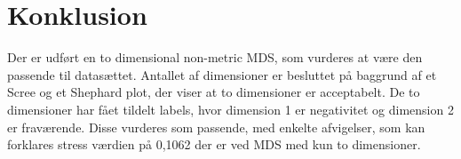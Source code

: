 \section*{Konklusion}
\label{Konklusion}
%
Der er udført en to dimensional non-metric MDS, som vurderes at være den passende til datasættet. Antallet af dimensioner er besluttet på baggrund af et Scree og et Shephard plot, der viser at to dimensioner er acceptabelt. De to dimensioner har fået tildelt labels, hvor dimension 1 er negativitet og dimension 2 er fraværende. Disse vurderes som passende, med enkelte afvigelser, som kan forklares stress værdien på 0,1062 der er ved MDS med kun to dimensioner. 